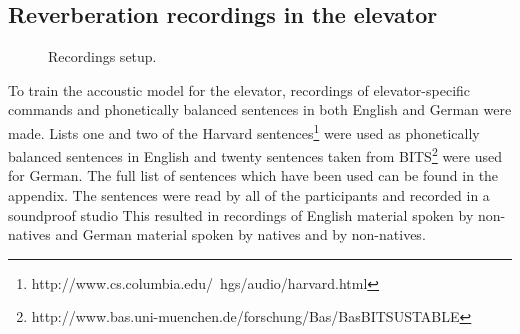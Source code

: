 \subsection{Reverberation recordings in the elevator}

\begin{figure}
\caption{Recordings setup.}
\label{fig:recordingsetup}
\end{figure}


To train the accoustic model for the elevator, recordings of elevator-specific commands and phonetically balanced sentences in both English and German were made. 
Lists one and two  of the Harvard sentences\footnote{http://www.cs.columbia.edu/~hgs/audio/harvard.html} were used as phonetically balanced sentences in English and twenty sentences taken from BITS\footnote{http://www.bas.uni-muenchen.de/forschung/Bas/BasBITSUSTABLE} were used for German. 
The full list of sentences which have been used can be found in the appendix. %
The sentences were read by all of the participants and recorded in a soundproof studio
This resulted in recordings of English material spoken by non-natives and German material spoken by natives and by non-natives.


